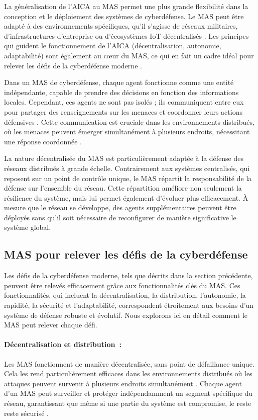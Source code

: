 La généralisation de l'AICA au MAS permet une plus grande flexibilité dans la conception et le déploiement des systèmes de cyberdéfense. Le MAS peut être adapté à des environnements spécifiques, qu'il s'agisse de réseaux militaires, d'infrastructures d'entreprise ou d'écosystèmes IoT décentralisés \cite{kott2023autonomous}. Les principes qui guident le fonctionnement de l'AICA (décentralisation, autonomie, adaptabilité) sont également au cœur du MAS, ce qui en fait un cadre idéal pour relever les défis de la cyberdéfense moderne \cite{kolias2011swarm}.

Dans un MAS de cyberdéfense, chaque agent fonctionne comme une entité indépendante, capable de prendre des décisions en fonction des informations locales. Cependant, ces agents ne sont pas isolés ; ils communiquent entre eux pour partager des renseignements sur les menaces et coordonner leurs actions défensives \cite{kolias2011swarm}. Cette communication est cruciale dans les environnements distribués, où les menaces peuvent émerger simultanément à plusieurs endroits, nécessitant une réponse coordonnée \cite{bace2001intrusion}.

La nature décentralisée du MAS est particulièrement adaptée à la défense des réseaux distribués à grande échelle. Contrairement aux systèmes centralisés, qui reposent sur un point de contrôle unique, le MAS répartit la responsabilité de la défense sur l'ensemble du réseau. Cette répartition améliore non seulement la résilience du système, mais lui permet également d'évoluer plus efficacement. À mesure que le réseau se développe, des agents supplémentaires peuvent être déployés sans qu'il soit nécessaire de reconfigurer de manière significative le système global.

\subsection{MAS pour relever les défis de la cyberdéfense}

Les défis de la cyberdéfense moderne, tels que décrits dans la section précédente, peuvent être relevés efficacement grâce aux fonctionnalités clés du MAS. Ces fonctionnalités, qui incluent la décentralisation, la distribution, l'autonomie, la rapidité, la sécurité et l'adaptabilité, correspondent étroitement aux besoins d'un système de défense robuste et évolutif. Nous explorons ici en détail comment le MAS peut relever chaque défi.

\paragraph{Décentralisation et distribution :}
Les MAS fonctionnent de manière décentralisée, sans point de défaillance unique. Cela les rend particulièrement efficaces dans les environnements distribués où les attaques peuvent survenir à plusieurs endroits simultanément \cite{kolias2011swarm}. Chaque agent d'un MAS peut surveiller et protéger indépendamment un segment spécifique du réseau, garantissant que même si une partie du système est compromise, le reste reste sécurisé \cite{shakarian2015cyber}.

